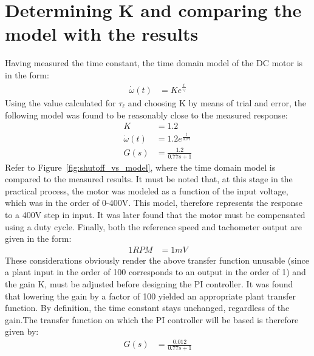 \section{Determining K and comparing the model with the results}
Having measured the time constant, the time domain model of the DC motor is in the form:
\begin{align}
	\dot{\omega}(t) &= Ke^{\frac{t}{\tau_\ell} }
\end{align}
Using the value calculated for $\tau_\ell$ and choosing K by means of trial and error, the following model was found to be reasonably close to the measured response:
\begin{align}\label{eq:1}
	K &= 1.2\\
	\dot{\omega}(t) &= 1.2e^{\frac{t}{0.77} }\\
	G(s) &= \frac{1.2}{0.77s+1} 
\end{align}
Refer to Figure~\ref{fig:shutoff_vs_model}, where the time domain model is compared to the measured results. It must be noted that, at this stage in the practical process, the motor was modeled as a function of the input voltage, which was in the order of 0-400V. This model, therefore represents the response to a 400V step in input. It was later found that the motor must be compensated using a duty cycle. Finally, both the reference speed and tachometer output are given in the form:
\begin{align}
1 RPM &= 1mV	
\end{align}
These considerations obviously render the above transfer function unusable (since a plant input in the order of 100 corresponds to an output in the order of 1) and the gain K, must be adjusted before designing the PI controller. It was found that lowering the gain by a factor of 100 yielded an appropriate plant transfer function. By definition, the time constant stays unchanged, regardless of the gain.The transfer function on which the PI controller will be based is therefore given by:
\begin{align}
	\label{eq:motortf}
	G(s) &= \frac{0.012}{0.77s+1} 
\end{align}



